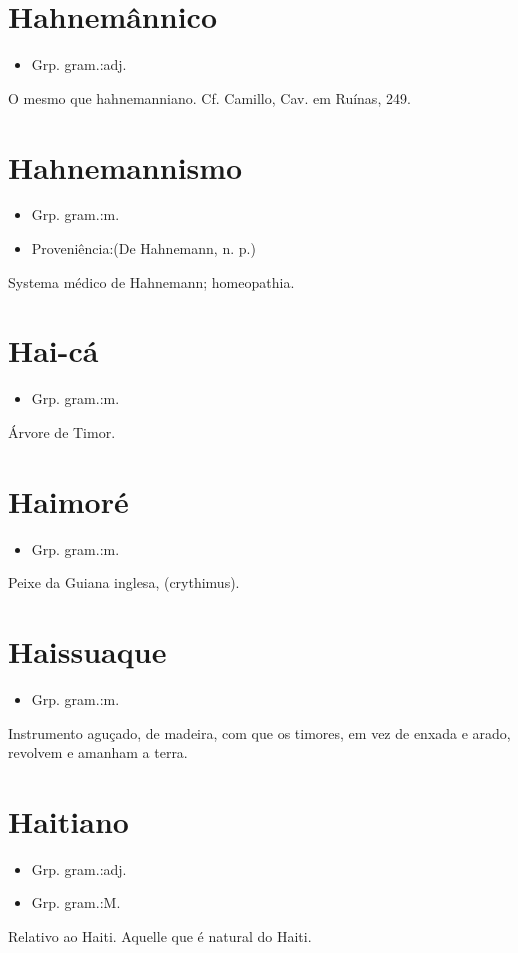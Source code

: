 \documentclass{article}
\begin{document}
\section{Hahnemânnico}
\begin{itemize}
\item {Grp. gram.:adj.}
\end{itemize}
O mesmo que \textunderscore hahnemanniano\textunderscore . Cf. Camillo, \textunderscore Cav. em Ruínas\textunderscore , 249.
\section{Hahnemannismo}
\begin{itemize}
\item {Grp. gram.:m.}
\end{itemize}
\begin{itemize}
\item {Proveniência:(De \textunderscore Hahnemann\textunderscore , n. p.)}
\end{itemize}
Systema médico de Hahnemann; homeopathia.
\section{Hai-cá}
\begin{itemize}
\item {Grp. gram.:m.}
\end{itemize}
Árvore de Timor.
\section{Haimoré}
\begin{itemize}
\item {Grp. gram.:m.}
\end{itemize}
Peixe da Guiana inglesa, (\textunderscore crythimus\textunderscore ).
\section{Haissuaque}
\begin{itemize}
\item {Grp. gram.:m.}
\end{itemize}
Instrumento aguçado, de madeira, com que os timores, em vez de enxada e arado, revolvem e amanham a terra.
\section{Haitiano}
\begin{itemize}
\item {Grp. gram.:adj.}
\end{itemize}
\begin{itemize}
\item {Grp. gram.:M.}
\end{itemize}
Relativo ao Haiti.
Aquelle que é natural do Haiti.
\end{document}

